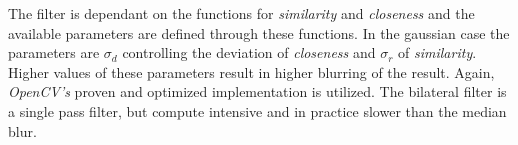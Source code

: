 The filter is dependant on the functions for \emph{similarity} and \emph{closeness} and the available parameters are defined through these functions.
In the gaussian case the parameters are $\sigma_d$ controlling the deviation of \emph{closeness} and $\sigma_r$ of \emph{similarity}.
Higher values of these parameters result in higher blurring of the result.
Again, \emph{OpenCV's} proven and optimized implementation is utilized.
The bilateral filter is a single pass filter, but compute intensive and in practice slower than the median blur.
